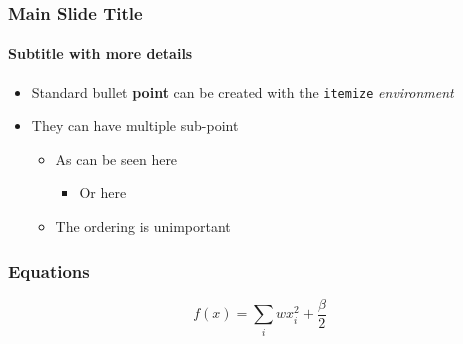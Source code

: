 \documentclass[aspectratio=1610]{beamer}
\begin{document}
\begin{frame}
    \frametitle{Main Slide Title}
    \framesubtitle{Subtitle with more details}

    \begin{itemize}
        \item Standard bullet \textbf{point} can be created with the \texttt{itemize} \textit{environment}
        \item They can have multiple sub-point
        \begin{itemize}
            \item As can be seen here
            \begin{itemize}
                \item Or here
            \end{itemize}
            \item The ordering is unimportant
        \end{itemize}
    \end{itemize}
\end{frame}


\begin{frame}
\frametitle{Equations}

    \begin{equation*}
        f(x) = \sum_i wx_i^2 + \frac{\beta}{2}
    \end{equation*}
\end{frame}
\end{document}
